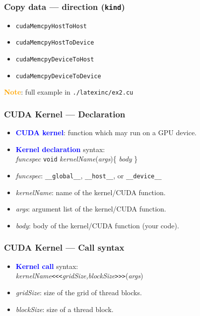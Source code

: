 \begin{frame}
  \frametitle{Copy data --- direction (\texttt{kind})}
  \begin{itemize}
    \item \texttt{cudaMemcpyHostToHost}
    \item \texttt{cudaMemcpyHostToDevice}
    \item \texttt{cudaMemcpyDeviceToHost}
    \item \texttt{cudaMemcpyDeviceToDevice}
  \end{itemize}
  \textbf{\textcolor{orange}{Note}}: full example in \texttt{./latexinc/ex2.cu}
\end{frame}

\begin{frame}
  \frametitle{CUDA Kernel --- Declaration}
  \begin{itemize}
    \item \textbf{\textcolor{blue}{CUDA kernel}}: function which may run on a GPU device.
    \item \textbf{\textcolor{blue}{Kernel declaration}} syntax:\\
          \hspace{6ex}\textit{funcspec} \texttt{void}
          \textit{kernelName}(\textit{args})\{ \textit{body} \}
    \item \textit{funcspec}: \texttt{\_\_global\_\_}, \texttt{\_\_host\_\_},
          or \texttt{\_\_device\_\_}
    \item \textit{kernelName}: name of the kernel/CUDA function.
    \item \textit{args}: argument list of the kernel/CUDA function.
    \item \textit{body}: body of the kernel/CUDA function (your code).
  \end{itemize}
\end{frame}

\begin{frame}
  \frametitle{CUDA Kernel --- Call syntax}
  \begin{itemize}
    \item \textbf{\textcolor{blue}{Kernel call}} syntax:\\
          \hspace{6ex}\textit{kernelName}\texttt{<<<}\textit{gridSize,blockSize}\texttt{>>>}(\textit{args})
    \item \textit{gridSize}: size of the grid of thread blocks.
    \item \textit{blockSize}: size of a thread block.
  \end{itemize}
\end{frame}

